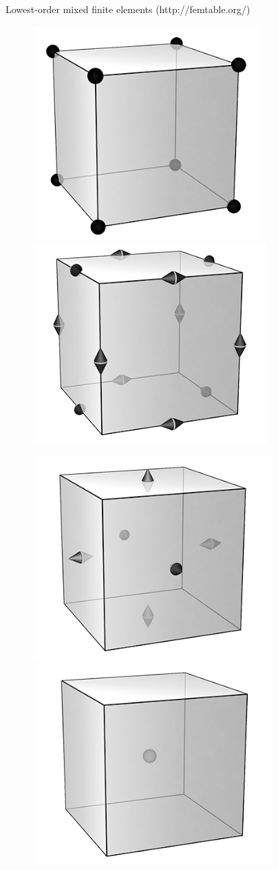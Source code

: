\documentclass[9pt]{beamer}
\begin{document}
\begin{frame}[c]{Lowest-order mixed finite elements (http://femtable.org/)}
\begin{center}
		\begin{figure}
			\centering
			\begin{minipage}{0.5\textwidth}
				\centering
				\includegraphics[width=0.475\linewidth]{figures/w0}%
				\includegraphics[width=0.5\linewidth]{figures/w1}
			\end{minipage}%
			\begin{minipage}{0.5\textwidth}\vspace{1mm}
				\centering
				\includegraphics[width=0.5\linewidth]{figures/w2}%
				\includegraphics[width=0.5\linewidth]{figures/w3}
			\end{minipage}
		\end{figure}
	\end{center}
\end{frame}
\end{document}
